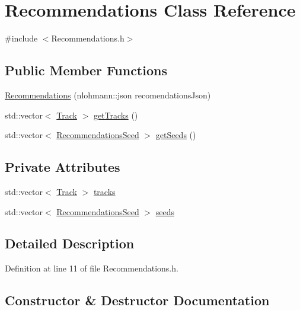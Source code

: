 \hypertarget{class_recommendations}{}\section{Recommendations Class Reference}
\label{class_recommendations}


{\ttfamily \#include $<$Recommendations.\+h$>$}

\subsection*{Public Member Functions}
\begin{DoxyCompactItemize}
\item 
\mbox{\hyperlink{class_recommendations_aa544f6300b7ae1b89acbf98ba3887d9d}{Recommendations}} (nlohmann\+::json recomendations\+Json)
\item 
std\+::vector$<$ \mbox{\hyperlink{class_track}{Track}} $>$ \mbox{\hyperlink{class_recommendations_aceffb86a41f8e50b85e65277e2bcd45d}{get\+Tracks}} ()
\item 
std\+::vector$<$ \mbox{\hyperlink{class_recommendations_seed}{Recommendations\+Seed}} $>$ \mbox{\hyperlink{class_recommendations_ab52386411dd0106999f96644a2b748ed}{get\+Seeds}} ()
\end{DoxyCompactItemize}
\subsection*{Private Attributes}
\begin{DoxyCompactItemize}
\item 
std\+::vector$<$ \mbox{\hyperlink{class_track}{Track}} $>$ \mbox{\hyperlink{class_recommendations_ab77429465c6b6d3ee0f0abb3b357e268}{tracks}}
\item 
std\+::vector$<$ \mbox{\hyperlink{class_recommendations_seed}{Recommendations\+Seed}} $>$ \mbox{\hyperlink{class_recommendations_a372f6b563c4fa0db77ed801bf86a859f}{seeds}}
\end{DoxyCompactItemize}


\subsection{Detailed Description}


Definition at line 11 of file Recommendations.\+h.



\subsection{Constructor \& Destructor Documentation}
\mbox{\label{class_recommendations_aa544f6300b7ae1b89acbf98ba3887d9d}} 
